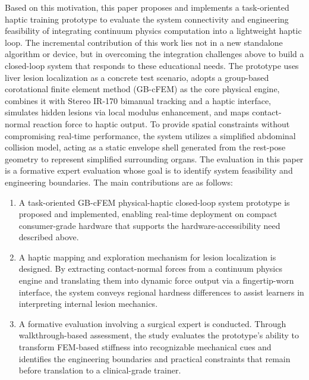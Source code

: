 \documentclass{ieeeaccess}
\begin{document}
Based on this motivation, this paper proposes and implements a task-oriented haptic training prototype to evaluate the system connectivity and engineering feasibility of integrating continuum physics computation into a lightweight haptic loop. The incremental contribution of this work lies not in a new standalone algorithm or device, but in overcoming the integration challenges above to build a closed-loop system that responds to these educational needs. The prototype uses liver lesion localization as a concrete test scenario, adopts a group-based corotational finite element method (GB-cFEM) as the core physical engine, combines it with Stereo IR-170 bimanual tracking and a haptic interface, simulates hidden lesions via local modulus enhancement, and maps contact-normal reaction force to haptic output. To provide spatial constraints without compromising real-time performance, the system utilizes a simplified abdominal collision model, acting as a static envelope shell generated from the rest-pose geometry to represent simplified surrounding organs. The evaluation in this paper is a formative expert evaluation whose goal is to identify system feasibility and engineering boundaries. The main contributions are as follows:
\begin{enumerate}
\item A task-oriented GB-cFEM physical-haptic closed-loop system prototype is proposed and implemented, enabling real-time deployment on compact consumer-grade hardware that supports the hardware-accessibility need described above.
\item A haptic mapping and exploration mechanism for lesion localization is designed. By extracting contact-normal forces from a continuum physics engine and translating them into dynamic force output via a fingertip-worn interface, the system conveys regional hardness differences to assist learners in interpreting internal lesion mechanics.
\item A formative evaluation involving a surgical expert is conducted. Through walkthrough-based assessment, the study evaluates the prototype's ability to transform FEM-based stiffness into recognizable mechanical cues and identifies the engineering boundaries and practical constraints that remain before translation to a clinical-grade trainer.
\end{enumerate}
\end{document}
